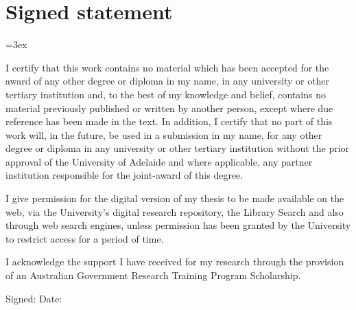 \chapter{Signed statement}
{\parindent=0pt\parskip=3ex

I certify that this work contains no material which has been accepted for the award of any other degree or diploma in my name, in any university or other tertiary institution and, to the best of my knowledge and belief, contains no material previously published or written by another person, except where due reference has been made in the text.
In addition, I certify that no part of this work will, in the future, be used in a submission in my name, for any other degree or diploma in any university or other tertiary institution without the prior approval of the University of Adelaide and where applicable, any partner institution responsible for the joint-award of this degree.

I give permission for the digital version of my thesis to be made available on the web, via the University’s digital research repository, the Library Search and also through web search engines, unless permission has been granted by the University to restrict access for a period of time.

I acknowledge the support I have received for my research through the provision of an Australian Government Research Training Program Scholarship.


Signed: \dotfill\quad 
Date: \dotfill

}